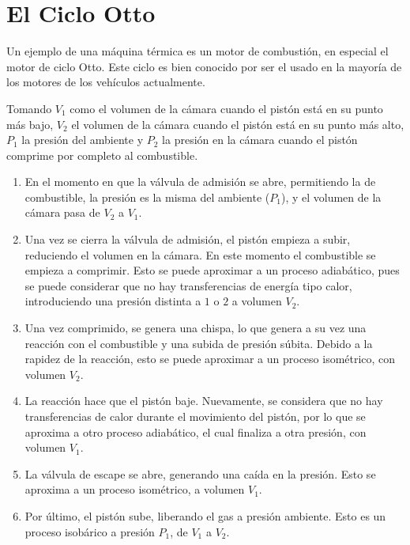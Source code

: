 \section{El Ciclo Otto}

Un ejemplo de una máquina térmica es un motor de combustión, en especial
el motor de ciclo Otto. Este ciclo es bien conocido por ser el usado
en la mayoría de los motores de los vehículos actualmente.

Tomando $V_1$ como el volumen de la cámara cuando el pistón está en su
punto más bajo, $V_2$ el volumen de la cámara cuando el pistón está en
su punto más alto, $P_1$ la presión del ambiente y $P_2$ la presión
en la cámara cuando el pistón comprime por completo al combustible.

\begin{enumerate}
  \item En el momento en que la válvula de admisión se abre, permitiendo la
        de combustible, la presión es la misma del ambiente ($P_1$), y el
        volumen de la cámara pasa de $V_2$ a $V_1$.

  \item Una vez se cierra la válvula de admisión, el pistón empieza a subir,
        reduciendo el volumen en la cámara. En este momento el combustible
        se empieza a comprimir. Esto se puede aproximar a un proceso
        adiabático, pues se puede considerar que no hay transferencias
        de energía tipo calor, introduciendo una presión distinta a $1$ o $2$
        a volumen $V_2$.

  \item Una vez comprimido, se genera una chispa, lo que genera a su vez
        una reacción con el combustible y una subida de presión súbita.
        Debido a la rapidez de la reacción, esto se puede aproximar a un
        proceso isométrico, con volumen $V_2$.

  \item La reacción hace que el pistón baje. Nuevamente, se considera que no
        hay transferencias de calor durante el movimiento del pistón, por lo
        que se aproxima a otro proceso adiabático, el cual finaliza a otra
        presión, con volumen $V_1$.

  \item La válvula de escape se abre, generando una caída en la presión.
        Esto se aproxima a un proceso isométrico, a volumen $V_1$.

  \item Por último, el pistón sube, liberando el gas a presión ambiente.
        Esto es un proceso isobárico a presión $P_1$, de $V_1$ a $V_2$.
\end{enumerate}

